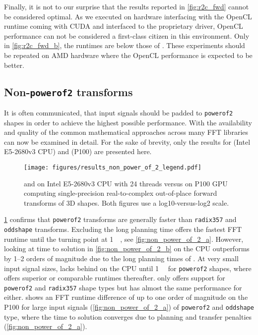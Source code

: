 Finally, it is not to our surprise that the \clfft{} results reported in \cref{fig:r2c_fwd} cannot be considered optimal. As we executed \clfft{} on \nvidia{} hardware interfacing with the OpenCL runtime coming with CUDA and interfaced to the \nvidia{} proprietary driver, OpenCL performance can not be considered a first-class citizen in this environment. Only in \cref{fig:r2c_fwd_b}, the \clfft{} runtimes are below those of \fftw{}. These experiments should be repeated on AMD hardware where the OpenCL performance is expected to be better.
 
\subsection{Non-\texttt{powerof2} transforms}
\label{ssec:nonpowerof2}

It is often communicated, that input signals should be padded to \texttt{powerof2} shapes in order to achieve the highest possible performance. With \gearshifft{} the availability and quality of the common mathematical approaches across many FFT libraries can now be examined in detail. 
For the sake of brevity, only the results for \fftw{} (Intel E5-2680v3 CPU) and \cufft{} (P100) are presented here.

\begin{figure}[!tbp]
  \centering
  \texttt{[image: figures/results\_non\_power\_of\_2\_legend.pdf]}\vspace{-1em}
  \hfill
  \caption{\fftw{} and \clfft{} on Intel E5-2680v3 CPU with 24 threads versus \cufft{} on P100 GPU computing single-precision real-to-complex out-of-place forward transforms of 3D shapes. Both figures use a log10-versus-log2 scale.}
  \label{fig:non_power_of_2}
\end{figure}

\cref{fig:non_power_of_2} confirms that \texttt{powerof2} transforms are generally faster than \texttt{radix357} and \texttt{oddshape} transforms. Excluding the long planning time \fftw{} offers the fastest FFT runtime until the turning point at \SI{1}{\mebi\byte}, see \cref{fig:non_power_of_2_a}.
However, looking at time to solution in \cref{fig:non_power_of_2_b} \clfft{} on the CPU outperforms \fftw{} by \numrange{1}{2} orders of magnitude due to the long planning times of \fftw{}. At very small input signal sizes, \cufft{} lacks behind \clfft{} on the CPU until \SI{1}{\kibi\byte} for \texttt{powerof2} shapes, where \cufft{} offers superior or comparable runtimes thereafter.
\clfft{} only offers support for \texttt{powerof2} and \texttt{radix357} shape types but has almost the same performance for either. \cufft{} shows an FFT runtime difference of up to one order of magnitude on the P100 for large input signals (\cref{fig:non_power_of_2_a}) of \texttt{powerof2} and \texttt{oddshape} type, where the time to solution converges due to planning and transfer penalties (\cref{fig:non_power_of_2_a}).

